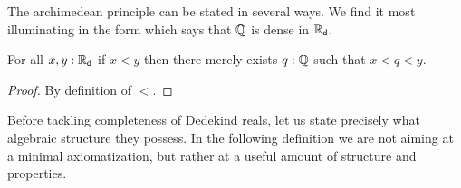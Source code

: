 %
%
%
The archimedean principle can be stated in several ways. We find it most illuminating in the
form which says that $\mathbb{Q}$ is dense in $\mathbb{R}_\mathsf{d}$.

\begin{thm} \label{RD-archimedean}
  For all $x, y : \mathbb{R}_\mathsf{d}$ if $x < y$ then there merely exists $q : \mathbb{Q}$ such that
  $x < q < y$.
\end{thm}

\begin{proof}
  By definition of $<$.
\end{proof}

Before tackling completeness of Dedekind reals, let us state precisely what algebraic
structure they possess. In the following definition we are not aiming at a minimal
axiomatization, but rather at a useful amount of structure and properties.

